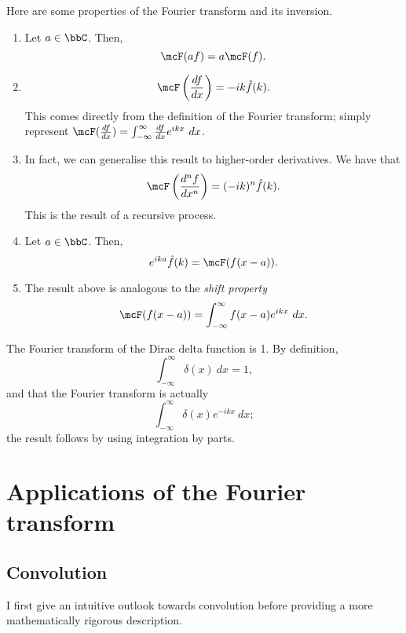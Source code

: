 \documentclass[a4paper, 12pt,oneside,openany]{book}
\begin{document}
Here are some properties of the Fourier transform and its inversion.

\begin{enumerate}
	\item Let $a \in \bbC$. Then, $$\mcF(af) = a\mcF(f).$$
	\item $$\mcF\left(\frac{df}{dx}\right) = -ik \hat{f}(k).$$ This comes directly from the definition of the Fourier transform; simply represent $\mcF(\frac{df}{dx}) = \int_{-\infty}^\infty \frac{df}{dx} e^{ikx}\ dx$.
	\item In fact, we can generalise this result to higher-order derivatives. We have that $$\mcF\left(\frac{d^nf}{dx^n}\right) = (-ik)^n \hat{f}(k).$$ This is the result of a recursive process.
	\item Let $a \in \bbC$. Then, $$e^{ika} \hat{f}(k) = \mcF(f(x-a)).$$ 
	\item The result above is analogous to the \emph{shift property} $$\mcF(f(x-a)) = \int_{-\infty}^\infty f(x-a) e^{ikx}\ dx.$$
\end{enumerate}

The Fourier transform of the Dirac delta function is 1. By definition, $$\int_{-\infty}^\infty \delta(x)\ dx =1,$$ and that the Fourier transform is actually $$\int_{-\infty}^\infty \delta(x) e^{-ikx}\ dx;$$ the result follows by using integration by parts. 


\section{Applications of the Fourier transform}

\subsection{Convolution}

I first give an intuitive outlook towards convolution before providing a more mathematically rigorous description. 
\end{document}
